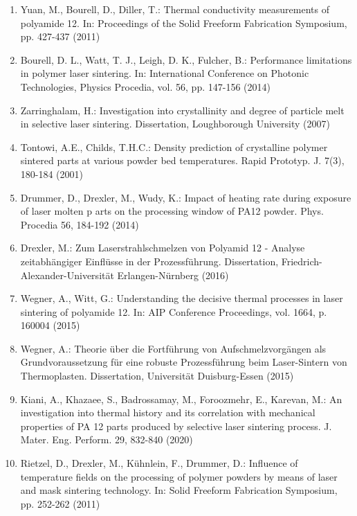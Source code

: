 \documentclass[10pt]{article}
\begin{document}
\begin{enumerate}
  \item Yuan, M., Bourell, D., Diller, T.: Thermal conductivity measurements of polyamide 12. In: Proceedings of the Solid Freeform Fabrication Symposium, pp. 427-437 (2011)

  \item Bourell, D. L., Watt, T. J., Leigh, D. K., Fulcher, B.: Performance limitations in polymer laser sintering. In: International Conference on Photonic Technologies, Physics Procedia, vol. 56, pp. 147-156 (2014)

  \item Zarringhalam, H.: Investigation into crystallinity and degree of particle melt in selective laser sintering. Dissertation, Loughborough University (2007)

  \item Tontowi, A.E., Childs, T.H.C.: Density prediction of crystalline polymer sintered parts at various powder bed temperatures. Rapid Prototyp. J. 7(3), 180-184 (2001)

  \item Drummer, D., Drexler, M., Wudy, K.: Impact of heating rate during exposure of laser molten $\mathrm{p}$ arts on the processing window of PA12 powder. Phys. Procedia 56, 184-192 (2014)

  \item Drexler, M.: Zum Laserstrahlschmelzen von Polyamid 12 - Analyse zeitabhängiger Einflüsse in der Prozessführung. Dissertation, Friedrich-Alexander-Universität Erlangen-Nürnberg (2016)

  \item Wegner, A., Witt, G.: Understanding the decisive thermal processes in laser sintering of polyamide 12. In: AIP Conference Proceedings, vol. 1664, p. 160004 (2015)

  \item Wegner, A.: Theorie über die Fortführung von Aufschmelzvorgängen als Grundvoraussetzung für eine robuste Prozessführung beim Laser-Sintern von Thermoplasten. Dissertation, Universität Duisburg-Essen (2015)

  \item Kiani, A., Khazaee, S., Badrossamay, M., Foroozmehr, E., Karevan, M.: An investigation into thermal history and its correlation with mechanical properties of PA 12 parts produced by selective laser sintering process. J. Mater. Eng. Perform. 29, 832-840 (2020)

  \item Rietzel, D., Drexler, M., Kühnlein, F., Drummer, D.: Influence of temperature fields on the processing of polymer powders by means of laser and mask sintering technology. In: Solid Freeform Fabrication Symposium, pp. 252-262 (2011)


\end{enumerate}
\end{document}

